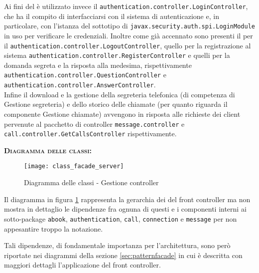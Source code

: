 \begin{description}
Ai fini del  è utilizzato invece il  \texttt{authentication.controller.LoginController}, che ha il compito di interfacciarsi con il sistema di autenticazione e, in particolare, con l'istanza del sottotipo di \texttt{javax.security.auth.spi.LoginModule} in uso per verificare le credenziali. Inoltre come già accennato sono presenti il  per il  \texttt{authentication.controller.LogoutController}, quello per la registrazione al sistema \texttt{authentication.controller.RegisterController} e quelli per la domanda segreta e la risposta alla medesima, rispettivamente \texttt{authentication.controller.QuestionController} e \texttt{authentication.controller.AnswerController}.\\

Infine il download e la gestione della segreteria telefonica (di competenza di \textsf{Gestione segreteria}) e dello storico delle chiamate (per quanto riguarda il componente \textsf{Gestione chiamate}) avvengono in risposta alle richieste dei client pervenute al pacchetto di controller \texttt{message.controller} e \texttt{call.controller.GetCallsController} rispettivamente. 

	\item{\scshape\bfseries Diagramma delle classi:}
\begin{figure}[H]
  \centering
  \texttt{[image: class\_facade\_server]}
  \caption{Diagramma delle classi - Gestione controller}\label{fig:facadeserver}
\end{figure}

Il diagramma in figura \ref{fig:facadeserver} rappresenta la gerarchia dei  del front controller ma non mostra in dettaglio le dipendenze fra ognuna di questi e i componenti interni ai sotto-package \texttt{abook}, \texttt{authentication}, \texttt{call}, \texttt{connection} e \texttt{message} per non appesantire troppo la notazione.

Tali dipendenze, di fondamentale importanza per l'architettura, sono però riportate nei diagrammi della sezione \vref{sec:patternfacade} in cui è descritta con maggiori dettagli l'applicazione del  front controller.
	

\end{description}
